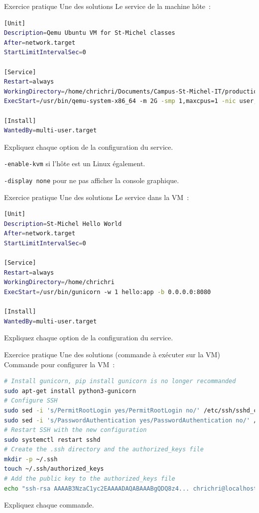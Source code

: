 \documentclass{beamer}
\begin{document}
    \begin{frame}[fragile]{Exercice pratique \execcounterdispinc{}}{Une des solutions}
        Le service de la machine hôte~:
        \begin{lstlisting}[language=bash]
[Unit]
Description=Qemu Ubuntu VM for St-Michel classes
After=network.target
StartLimitIntervalSec=0

[Service]
Restart=always
WorkingDirectory=/home/chrichri/Documents/Campus-St-Michel-IT/production-deployment
ExecStart=/usr/bin/qemu-system-x86_64 -m 2G -smp 1,maxcpus=1 -nic user,hostfwd=tcp::5022-:22,hostfwd=tcp::5080-:8080 -display none -hda linux.qcow2 -k fr -enable-kvm

[Install]
WantedBy=multi-user.target
        \end{lstlisting}
        Expliquez chaque option de la configuration du service.
        \pause
        \begin{dangercolorbox}
            \lstinline{-enable-kvm} si l'hôte est un Linux également.

            \lstinline{-display none} pour ne pas afficher la console graphique.
        \end{dangercolorbox}
    \end{frame}

    \begin{frame}[fragile]{Exercice pratique \execcounterdispinc{}}{Une des solutions}
        Le service dans la VM~:
        \begin{lstlisting}[language=bash]
[Unit]
Description=St-Michel Hello World
After=network.target
StartLimitIntervalSec=0

[Service]
Restart=always
WorkingDirectory=/home/chrichri
ExecStart=/usr/bin/gunicorn -w 1 hello:app -b 0.0.0.0:8080

[Install]
WantedBy=multi-user.target
        \end{lstlisting}
        Expliquez chaque option de la configuration du service.
    \end{frame}

    \begin{frame}[fragile]{Exercice pratique \execcounterdispinc{}}{Une des solutions (commande à exécuter sur la VM)}
        Commande pour configurer la VM~:
        \begin{lstlisting}[language=bash]
# Install gunicorn, pip install gunicorn is no longer recommanded
sudo apt-get install python3-gunicorn
# Configure SSH
sudo sed -i 's/PermitRootLogin yes/PermitRootLogin no/' /etc/ssh/sshd_config
sudo sed -i 's/PasswordAuthentication yes/PasswordAuthentication no/' /etc/ssh/sshd_config
# Restart SSH with the new configuration
sudo systemctl restart sshd
# Create the .ssh directory and the authorized_keys file
mkdir -p ~/.ssh
touch ~/.ssh/authorized_keys
# Add the public key to the authorized_keys file
echo "ssh-rsa AAAAB3NzaC1yc2EAAAADAQABAAABgQDQ8z4... chrichri@localhost" >> ~/.ssh/authorized_keys
        \end{lstlisting}
        Expliquez chaque commande.
    \end{frame}
\end{document}
